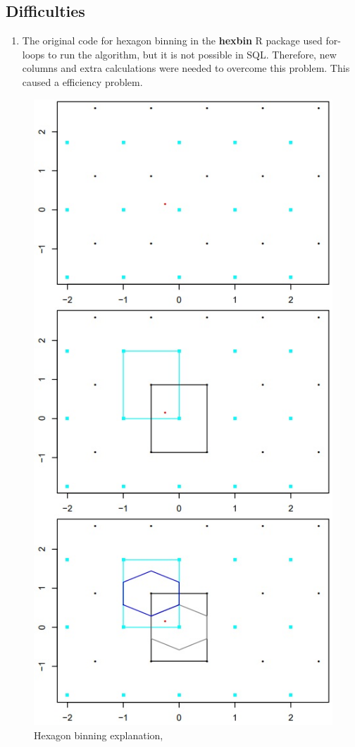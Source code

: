 \subsection{Difficulties}

\begin{enumerate}
    \item The original code for hexagon binning in the {\bf hexbin} {\sf R} package \citep{hexbinpackage} used for-loops to run the algorithm, but it is not possible in {\sf SQL}. Therefore, new columns and extra calculations were needed to overcome this problem. This caused a efficiency problem.

\end{enumerate}

\begin{figure}[H]
\centering
    \includegraphics[scale = 0.9]{img/hex-e1.jpg}
    \caption{Hexagon binning explanation, \citep{hexbinfig}}
    \label{fig:hex-e1}
\end{figure}




